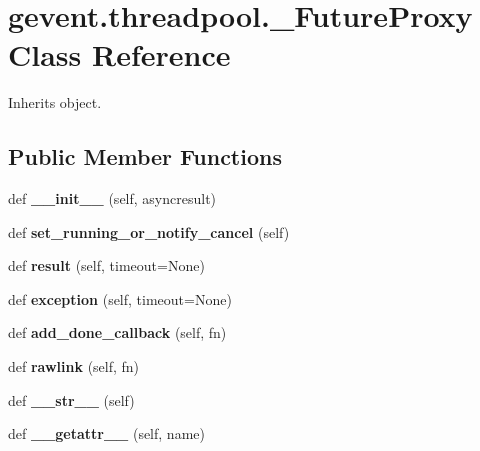 \hypertarget{classgevent_1_1threadpool_1_1___future_proxy}{}\section{gevent.\+threadpool.\+\_\+\+Future\+Proxy Class Reference}
\label{classgevent_1_1threadpool_1_1___future_proxy}


Inherits object.

\subsection*{Public Member Functions}
\begin{DoxyCompactItemize}
\item 
\mbox{\label{classgevent_1_1threadpool_1_1___future_proxy_aa04a4a983992fdbd4e464fa6652cce77}} 
def {\bfseries \+\_\+\+\_\+init\+\_\+\+\_\+} (self, asyncresult)
\item 
\mbox{\label{classgevent_1_1threadpool_1_1___future_proxy_ab91425edb1b7f0b26fd9f368bd760917}} 
def {\bfseries set\+\_\+running\+\_\+or\+\_\+notify\+\_\+cancel} (self)
\item 
\mbox{\label{classgevent_1_1threadpool_1_1___future_proxy_a557dc87bd2a19a8e359d98bb98417126}} 
def {\bfseries result} (self, timeout=None)
\item 
\mbox{\label{classgevent_1_1threadpool_1_1___future_proxy_a36767b1efd87d7b722b3e0d15f78fd09}} 
def {\bfseries exception} (self, timeout=None)
\item 
\mbox{\label{classgevent_1_1threadpool_1_1___future_proxy_ab8d084f5d95c8352fbd2e7842f5099ce}} 
def {\bfseries add\+\_\+done\+\_\+callback} (self, fn)
\item 
\mbox{\label{classgevent_1_1threadpool_1_1___future_proxy_a1bac7362cccda0ab63f2979c7eeeec2d}} 
def {\bfseries rawlink} (self, fn)
\item 
\mbox{\label{classgevent_1_1threadpool_1_1___future_proxy_a0e631cdab9fadf085c8d0b0c47931237}} 
def {\bfseries \+\_\+\+\_\+str\+\_\+\+\_\+} (self)
\item 
\mbox{\label{classgevent_1_1threadpool_1_1___future_proxy_a84c25dffe31585bdb5b1a18259103d11}} 
def {\bfseries \+\_\+\+\_\+getattr\+\_\+\+\_\+} (self, name)
\end{DoxyCompactItemize}
